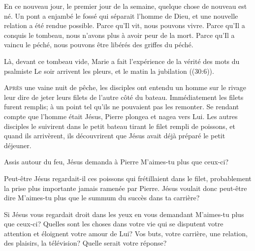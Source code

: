 En ce nouveau jour, le premier jour de la semaine,
 quelque chose de nouveau est né. Un pont a enjambé le fossé
 qui séparait l'homme de Dieu, et une nouvelle relation a été rendue possible.
 Parce qu'Il vit, nous pouvons vivre. Parce qu'Il a conquis le tombeau,
 nous n'avons plus à avoir peur de la mort. Parce qu'Il a vaincu le péché,
 nous pouvons être libérés des griffes du péché.

Là, devant ce tombeau vide, Marie a fait l'expérience de la vérité
 des mots du psalmiste\frcolon{}
 \Og Le soir arrivent les pleurs, et le matin la jubilation \Fg{}
 ((30:6)).

\dvrule






\lettrine{A}{près} une vaine nuit de pêche,
 les disciples ont entendu un homme sur le rivage
 leur dire de jeter leurs filets
 de l'autre côté du bateau. Immédiatement les filets furent remplis;
 à un point tel qu'ils ne pouvaient pas les remonter.
 Se rendant compte que l'homme était Jésus, Pierre plongea et nagea vers Lui.
 Les autres disciples le suivirent dans le petit bateau
 tirant le filet rempli de poissons, et quand ils arrivèrent,
 ils découvrirent que Jésus avait déjà préparé le petit déjeuner.

Assis autour du feu, Jésus demanda à Pierre\frcolon{} 
 \Og M'aimes-tu plus que ceux-ci? \Fg{}


Peut-être Jésus regardait-il ces poissons qui frétillaient dans le filet,
 probablement la prise plus importante jamais ramenée par Pierre.
 Jésus voulait donc peut-être dire\frcolon{} 
 \Og M'aimes-tu plus que le summum du succès dans ta carrière? \Fg{}

Si Jésus vous regardait droit dans les yeux en vous demandant\frcolon{}
 \Og M'aimes-tu plus que ceux-ci? \Fg{} 
 Quelles sont les choses dans votre vie qui se disputent votre attention
 et éloignent votre amour de Lui? Vos buts, votre carrière, une relation,
 des plaisirs, la télévision? Quelle serait votre réponse?

